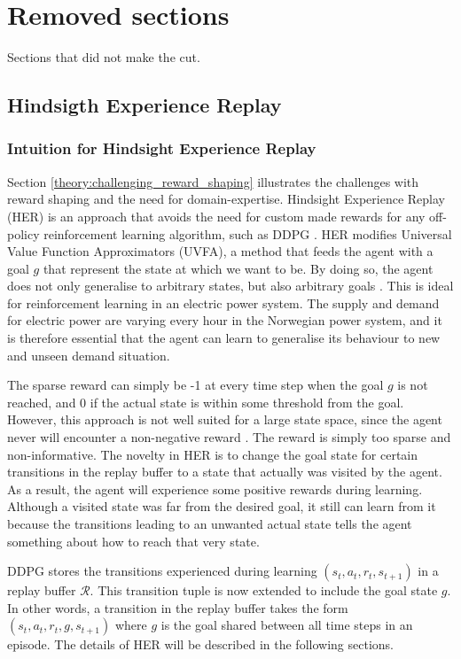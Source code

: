 \documentclass[class=book, crop=false, 11pt]{standalone}
\begin{document}
\chapter{Removed sections}
Sections that did not make the cut. 


\section{Hindsigth Experience Replay}
\subsection{Intuition for Hindsight Experience Replay}
Section \ref{theory:challenging_reward_shaping}  illustrates the challenges with reward shaping and the need for domain-expertise. Hindsight Experience Replay (HER) is an approach that avoids the need for custom made rewards for any off-policy reinforcement learning algorithm, such as DDPG \cite{DBLP:journals/corr/Andrychowicz_HER}. HER modifies Universal Value Function Approximators (UVFA), a method that feeds the agent with a goal $g$ that represent the state at which we want to be. By doing so, the agent does not only generalise to arbitrary states, but also arbitrary goals \cite{schaul15_goal_states}. This is ideal for reinforcement learning in an electric power system. The
supply and demand for electric power are varying every hour in the Norwegian power system, and it is therefore essential that the agent can learn to generalise its behaviour to new and unseen demand situation. 

The sparse reward can simply be -1 at every time step when the goal $g$ is not reached, and 0 if the actual state is within some threshold from the goal. However, this approach is not well suited for a large state space, since the agent never will encounter a non-negative reward \cite{DBLP:journals/corr/Andrychowicz_HER}. The reward is simply too sparse and non-informative. The novelty in HER is to change the goal state for certain transitions in the replay buffer to a state that actually was visited by the agent. As a result, the agent will experience some positive rewards during learning. Although a visited state was far from the desired goal, it still can learn from it because the transitions leading to an unwanted actual state tells the agent something about how to reach that very state. 

DDPG stores the transitions experienced during learning $(s_{t},a_{t},r_{t},s_{t+1})$ in a replay buffer $\mathcal{R}$. This transition tuple is now extended to include the goal state $g$. In other words, a transition in the replay buffer takes the form $(s_{t},a_{t},r_{t},g,s_{t+1})$ where $g$ is the goal shared between all time steps in an episode. The details of HER will be described in the following sections.
\end{document}
